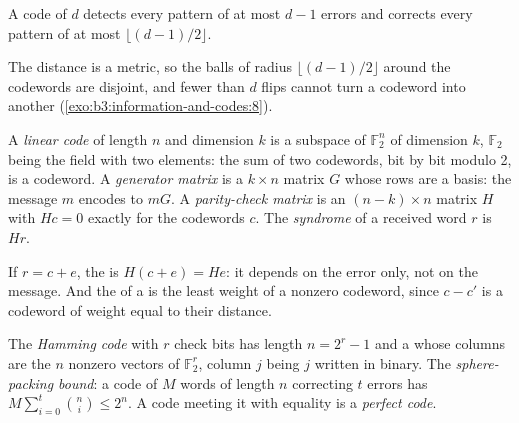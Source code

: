 \begin{theorem}\label{thm:b3:information-and-codes:distance}
A code of  $d$ detects every pattern of at most $d - 1$ errors and corrects every pattern of at most $\lfloor (d - 1)/2 \rfloor$.
\end{theorem}

The distance is a metric, so the balls of radius $\lfloor (d - 1)/2 \rfloor$ around the codewords are disjoint, and fewer than $d$ flips cannot turn a codeword into another (\cref{exo:b3:information-and-codes:8}).

\begin{definition}\label{def:b3:information-and-codes:linear}
A \emph{linear code} of length $n$ and dimension $k$ is a subspace of $\mathbb{F}_2^n$ of dimension $k$, $\mathbb{F}_2$ being the field with two elements: the sum of two codewords, bit by bit modulo 2, is a codeword. A \emph{generator matrix} is a $k \times n$ matrix $G$ whose rows are a basis: the message $m$ encodes to $mG$. A \emph{parity-check matrix} is an $(n - k) \times n$ matrix $H$ with $Hc = 0$ exactly for the codewords $c$. The \emph{syndrome} of a received word $r$ is $Hr$.
\end{definition}

If $r = c + e$, the  is $H(c + e) = He$: it depends on the error only, not on the message. And the  of a  is the least weight of a nonzero codeword, since $c - c'$ is a codeword of weight equal to their distance.

\begin{definition}\label{def:b3:information-and-codes:hamming}
The \emph{Hamming code} with $r$ check bits has length $n = 2^r - 1$ and a  whose columns are the $n$ nonzero vectors of $\mathbb{F}_2^r$, column $j$ being $j$ written in binary. The \emph{sphere-packing bound}: a code of $M$ words of length $n$ correcting $t$ errors has $M \sum_{i=0}^{t} \binom{n}{i} \le 2^n$. A code meeting it with equality is a \emph{perfect code}.
\end{definition}

